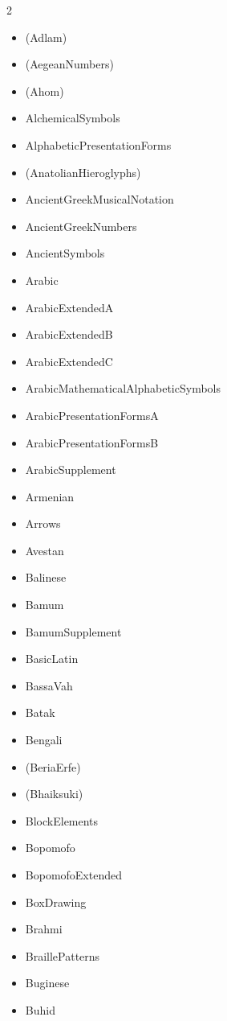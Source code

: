 \documentclass{article}
\newenvironment{itemlist}{%
  \begin{itemize}
  \setlength{\itemsep}{0pt}
  \setlength{\parsep}{0pt}
  \setlength{\topsep}{0pt}
  \setlength{\partopsep}{0pt}
  \setlength{\parskip}{0pt}
  \setlength{\labelsep}{5pt}}%
{
  \end{itemize}}
\begin{document}
    \begin{multicols*}{2}
      \begin{itemlist}
        \item (Adlam)
        \item (AegeanNumbers)
        \item (Ahom)
        \item AlchemicalSymbols
        \item AlphabeticPresentationForms
        \item (AnatolianHieroglyphs)
        \item AncientGreekMusicalNotation
        \item AncientGreekNumbers
        \item AncientSymbols
        \item Arabic
        \item ArabicExtendedA
        \item ArabicExtendedB
        \item ArabicExtendedC
        \item ArabicMathematicalAlphabeticSymbols
        \item ArabicPresentationFormsA
        \item ArabicPresentationFormsB
        \item ArabicSupplement
        \item Armenian
        \item Arrows
        \item Avestan
        \item Balinese
        \item Bamum
        \item BamumSupplement
        \item BasicLatin
        \item BassaVah
        \item Batak
        \item Bengali
        \item (BeriaErfe)
        \item (Bhaiksuki)
        \item BlockElements
        \item Bopomofo
        \item BopomofoExtended
        \item BoxDrawing
        \item Brahmi
        \item BraillePatterns
        \item Buginese
        \item Buhid

\end{itemlist}
\end{multicols*}
\end{document}
